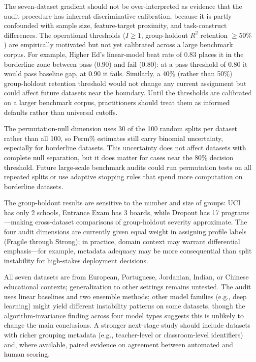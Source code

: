 \documentclass[10pt,letterpaper]{article}
\begin{document}
The seven-dataset gradient should not be over-interpreted as evidence that the audit procedure has inherent discriminative calibration, because it is partly confounded with sample size, feature-target proximity, and task-construct differences. The operational thresholds ($I \geq 1$, group-holdout $R^2$ retention $\geq 50\%$) are empirically motivated but not yet calibrated across a large benchmark corpus. For example, Higher Ed's linear-model beat rate of 0.83 places it in the borderline zone between pass (0.90) and fail (0.80): at a pass threshold of 0.80 it would pass baseline gap, at 0.90 it fails. Similarly, a 40\% (rather than 50\%) group-holdout retention threshold would not change any current assignment but could affect future datasets near the boundary. Until the thresholds are calibrated on a larger benchmark corpus, practitioners should treat them as informed defaults rather than universal cutoffs.

The permutation-null dimension uses 30 of the 100 random splits per dataset rather than all 100, so Perm\% estimates still carry binomial uncertainty, especially for borderline datasets. This uncertainty does not affect datasets with complete null separation, but it does matter for cases near the 80\% decision threshold. Future large-scale benchmark audits could run permutation tests on all repeated splits or use adaptive stopping rules that spend more computation on borderline datasets.

The group-holdout results are sensitive to the number and size of groups: UCI has only 2 schools, Entrance Exam has 3 boards, while Dropout has 17 programs---making cross-dataset comparisons of group-holdout severity approximate. The four audit dimensions are currently given equal weight in assigning profile labels (Fragile through Strong); in practice, domain context may warrant differential emphasis---for example, metadata adequacy may be more consequential than split instability for high-stakes deployment decisions.

All seven datasets are from European, Portuguese, Jordanian, Indian, or Chinese educational contexts; generalization to other settings remains untested. The audit uses linear baselines and two ensemble methods; other model families (e.g., deep learning) might yield different instability patterns on some datasets, though the algorithm-invariance finding across four model types suggests this is unlikely to change the main conclusions. A stronger next-stage study should include datasets with richer grouping metadata (e.g., teacher-level or classroom-level identifiers) and, where available, paired evidence on agreement between automated and human scoring.
\end{document}
